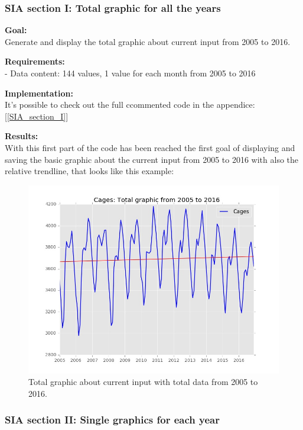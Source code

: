 \newpage

\subsubsection{SIA section I: Total graphic for all the years}
\textbf{Goal:}\\
Generate and display the total graphic about current input from 2005 to 2016.

\textbf{Requirements:}\\
- Data content: 144 values, 1 value for each month from 2005 to 2016

\textbf{Implementation:}\\
It's possible to check out the full ccommented code in the appendice: [\ref{SIA_section_I}]

\textbf{Results:} \\
With this first part of the code has been reached the first goal of displaying and saving the basic graphic about the current input from 2005 to 2016 with also the relative trendline, that looks like this example:

\begin{figure}[H]
\includegraphics[width=1\textwidth]{Files/Cages_Total.jpg}
\caption{Total graphic about current input with total data from 2005 to 2016.}
\end{figure}



\newpage
\subsubsection{SIA section II: Single graphics for each year}

